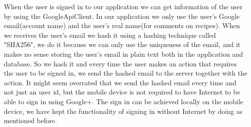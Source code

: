 When the user is signed in to our application we can get information of the user by using the GoogleApiClient.
In our application we only use the user's Google email(account name) and the user's real name(for comments on recipes). 
When we receives the user's email we hash it using a hashing technique called "SHA256", we do it because we can only use the uniqueness of the email, and it makes no sense storing the user's email in plain text both in the application and database. 
So we hash it and every time the user makes an action that requires the user to be signed in, we send the hashed email to the server together with the action. 
It might seem overrated that we send the hashed email every time and not just an user id, but the mobile device is not required to have Internet to be able to sign in using Google+. The sign in can be achieved locally on the mobile device, we have kept the functionality of signing in without Internet by doing as mentioned before.

